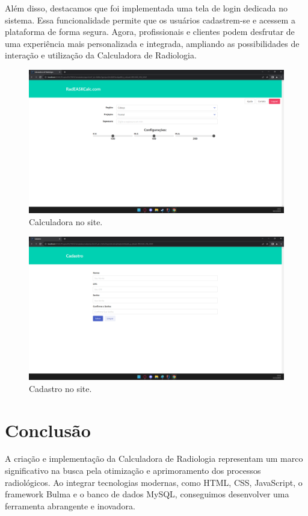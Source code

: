 \documentclass[conference]{IEEEtran}
\begin{document}
Além disso, destacamos que foi implementada uma tela de login dedicada no sistema. Essa funcionalidade permite que os usuários cadastrem-se e acessem a plataforma de forma segura. Agora, profissionais e clientes podem desfrutar de uma experiência mais personalizada e integrada, ampliando as possibilidades de interação e utilização da Calculadora de Radiologia.

\begin{figure}[h]
  \centering
  \includegraphics[width=0.9\columnwidth]{app.png}
  \caption{Calculadora no site.}
  \label{fig:calculadora}
\end{figure}

\begin{figure}[h]
  \centering
  \includegraphics[width=0.9\columnwidth]{cadastro.png}
  \caption{Cadastro no site.}
  \label{fig:cadastro}
\end{figure}
 
\section{Conclusão}
A criação e implementação da Calculadora de Radiologia representam um marco significativo na busca pela otimização e aprimoramento dos processos radiológicos. Ao integrar tecnologias modernas, como HTML, CSS, JavaScript, o framework Bulma e o banco de dados MySQL, conseguimos desenvolver uma ferramenta abrangente e inovadora.
\end{document}
